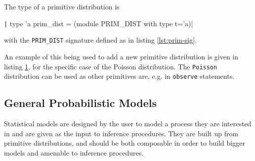 The type of a primitive distribution is 
\begin{center}
																																																																										
	\texttt| type 'a prim_dist = (module PRIM_DIST with type t='a)|
\end{center}
with the \texttt{PRIM\_DIST} signature defined as in listing \ref{lst:prim-sig}.

\begin{figure}[!htb]
	\begin{minipage}{0.5\textwidth}
		\label{lst:prim-sig}
	\end{minipage}
	\begin{minipage}{0.5\textwidth}
		\label{lst:new-dist}
	\end{minipage}
\end{figure}
	
	
An example of this being used to add a new primitive distribution is given in listing \ref{lst:new-dist}, for the specific case of the Poisson distribution. The \texttt{Poisson} distribution can be used as other primitives are, e.g. in \texttt{observe} statements.
	
	
\subsection{General Probabilistic Models}
Statistical models are designed by the user to model a process they are interested in and are given as the input to inference procedures. They are built up from primitive distributions, and should be both composable in order to build bigger models and amenable to inference procedures.

